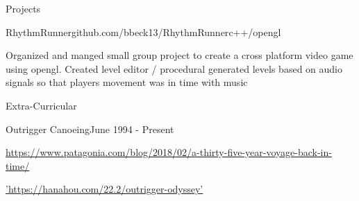 \documentclass{resume} %
\begin{document}
\begin{rSection}{Projects} \itemsep -2pt
\begin{rSubsection}{RhythmRunner}{github.com/bbeck13/RhythmRunner}{c++/opengl}{}
\item Organized and manged small group project to create a cross platform video game using opengl. Created level editor / procedural generated levels based on audio signals so that players movement was in time with music

\end{rSubsection}

\end{rSection}

\begin{rSection}{Extra-Curricular}
\begin{rSubsection} {Outrigger Canoeing}{June 1994 - Present}{}{}
\item \href{https://www.patagonia.com/blog/2018/02/a-thirty-five-year-voyage-back-in-time/}{https://www.patagonia.com/blog/2018/02/a-thirty-five-year-voyage-back-in-time/}
\item \href{https://hanahou.com/22.2/outrigger-odyssey}{'https://hanahou.com/22.2/outrigger-odyssey'}
\end{rSubsection}
\end{rSection}
\end{document}
